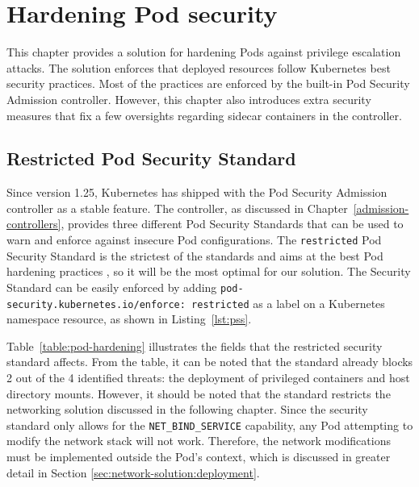 \documentclass[english, 12pt, a4paper, sci, utf8, a-2b, online]{aaltothesis}
\begin{document}
\clearpage

\section{Hardening Pod security} \label{sec:pod-hardening}

This chapter provides a solution for hardening Pods against privilege escalation attacks.
The solution enforces that deployed resources follow Kubernetes best security practices.
Most of the practices are enforced by the built-in Pod Security Admission controller.
However, this chapter also introduces extra security measures that fix a few oversights regarding sidecar containers in the controller.


\subsection{Restricted Pod Security Standard}

Since version 1.25, Kubernetes has shipped with the Pod Security Admission controller as a stable feature.
The controller, as discussed in Chapter~\ref{admission-controllers}, provides three different Pod Security Standards that can be used to warn and enforce against insecure Pod configurations.
The \texttt{restricted} Pod Security Standard is the strictest of the standards and aims at the best Pod hardening practices \cite{k8s-docs-pss}, so it will be the most optimal for our solution.
The Security Standard can be easily enforced by adding \texttt{pod-security.kubernetes.io/enforce: restricted} as a label on a Kubernetes namespace resource, as shown in Listing~\ref{lst:pss}.



Table~\ref{table:pod-hardening} illustrates the fields that the restricted security standard affects.
From the table, it can be noted that the standard already blocks 2 out of the 4 identified threats: the deployment of privileged containers and host directory mounts.
However, it should be noted that the standard restricts the networking solution discussed in the following chapter.
Since the security standard only allows for the \texttt{NET\_BIND\_SERVICE} capability, any Pod attempting to modify the network stack will not work.
Therefore, the network modifications must be implemented outside the Pod's context, which is discussed in greater detail in Section \ref{sec:network-solution:deployment}.
\end{document}
